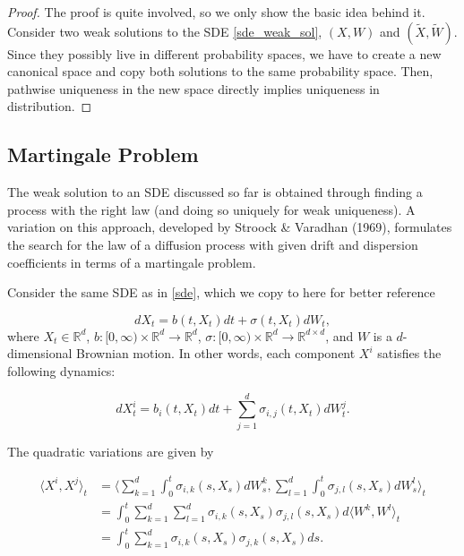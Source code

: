 \documentclass{article}
\begin{document}
\begin{proof}
The proof is quite involved, so we only show the basic idea behind it. Consider two weak solutions to the SDE \eqref{sde_weak_sol}, $(X,W)$ and $(\tilde{X},\tilde{W})$. Since they possibly live in different probability spaces, we have to create a new canonical space and copy both solutions to the same probability space. Then, pathwise uniqueness in the new space directly implies uniqueness in distribution. 
\end{proof}

\subsection{Martingale Problem}
The weak solution to an SDE discussed so far is obtained through finding a process with the right law (and doing so uniquely for weak uniqueness). A variation on this approach, developed by Stroock \& Varadhan (1969), formulates the search for the law of a diffusion process with given drift and dispersion coefficients in terms of a martingale problem. 

Consider the same SDE as in \eqref{sde}, which we copy to here for better reference

\begin{equation*}
dX_t = b(t,X_t)dt + \sigma(t,X_t)dW_t, 
\end{equation*}
where $X_t\in\mathbb{R}^d$, $b:[0,\infty)\times\mathbb{R}^d\rightarrow\mathbb{R}^d$, $\sigma:[0,\infty)\times\mathbb{R}^d\rightarrow\mathbb{R}^{d\times d}$, and $W$ is a $d$-dimensional Brownian motion. In other words, each component $X^i$ satisfies the following dynamics:

\begin{equation} \label{mart_prob_sde}
dX^i_t = b_i(t,X_t)dt + \sum^d_{j=1}\sigma_{i,j}(t,X_t)dW^j_t.
\end{equation}

The quadratic variations are given by 

\begin{equation*}
\begin{aligned}
\langle X^i, X^j\rangle_t &= \langle \sum^d_{k=1}\int^t_0\sigma_{i,k}(s,X_s)dW^k_s, \sum^d_{l=1}\int_0^t\sigma_{j,l}(s,X_s)dW^l_s\rangle_t\\
&=\int_0^t \sum^d_{k=1}\sum^d_{l=1}\sigma_{i,k}(s,X_s)\sigma_{j,l}(s,X_s)d\langle W^k,W^l\rangle_t\\
&=\int_0^t \sum^d_{k=1}\sigma_{i,k}(s,X_s)\sigma_{j,k}(s,X_s)ds.
\end{aligned}
\end{equation*}
\end{document}
